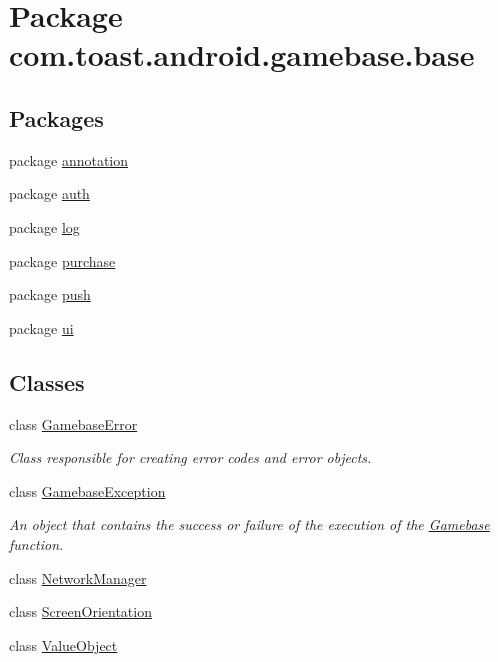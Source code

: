 \hypertarget{namespacecom_1_1toast_1_1android_1_1gamebase_1_1base}{}\section{Package com.\+toast.\+android.\+gamebase.\+base}
\label{namespacecom_1_1toast_1_1android_1_1gamebase_1_1base}
\subsection*{Packages}
\begin{DoxyCompactItemize}
\item 
package \hyperlink{namespacecom_1_1toast_1_1android_1_1gamebase_1_1base_1_1annotation}{annotation}
\item 
package \hyperlink{namespacecom_1_1toast_1_1android_1_1gamebase_1_1base_1_1auth}{auth}
\item 
package \hyperlink{namespacecom_1_1toast_1_1android_1_1gamebase_1_1base_1_1log}{log}
\item 
package \hyperlink{namespacecom_1_1toast_1_1android_1_1gamebase_1_1base_1_1purchase}{purchase}
\item 
package \hyperlink{namespacecom_1_1toast_1_1android_1_1gamebase_1_1base_1_1push}{push}
\item 
package \hyperlink{namespacecom_1_1toast_1_1android_1_1gamebase_1_1base_1_1ui}{ui}
\end{DoxyCompactItemize}
\subsection*{Classes}
\begin{DoxyCompactItemize}
\item 
class \hyperlink{classcom_1_1toast_1_1android_1_1gamebase_1_1base_1_1_gamebase_error}{Gamebase\+Error}
\begin{DoxyCompactList}\small\item\em Class responsible for creating error codes and error objects. \end{DoxyCompactList}\item 
class \hyperlink{classcom_1_1toast_1_1android_1_1gamebase_1_1base_1_1_gamebase_exception}{Gamebase\+Exception}
\begin{DoxyCompactList}\small\item\em An object that contains the success or failure of the execution of the \hyperlink{classcom_1_1toast_1_1android_1_1gamebase_1_1_gamebase}{Gamebase} function. \end{DoxyCompactList}\item 
class \hyperlink{classcom_1_1toast_1_1android_1_1gamebase_1_1base_1_1_network_manager}{Network\+Manager}
\item 
class \hyperlink{classcom_1_1toast_1_1android_1_1gamebase_1_1base_1_1_screen_orientation}{Screen\+Orientation}
\item 
class \hyperlink{classcom_1_1toast_1_1android_1_1gamebase_1_1base_1_1_value_object}{Value\+Object}
\end{DoxyCompactItemize}
